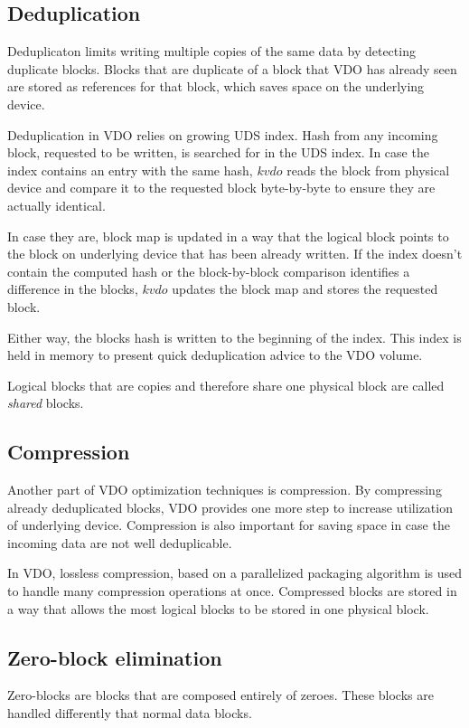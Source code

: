 \documentclass[
  color, %
  table, %
  lof,   %
  lot,   %
]{fithesis3}
\begin{document}
\subsection{Deduplication}
Deduplicaton limits writing multiple copies of the same data by detecting duplicate blocks. Blocks that are duplicate of a block that VDO has already seen are stored as references for that block, which saves space on the underlying device.

Deduplication in VDO relies on growing UDS index. Hash from any incoming block, requested to be written, is searched for in the UDS index. In case the index contains an entry with the same hash, $kvdo$ reads the block from physical device and compare it to the requested block byte-by-byte to ensure they are actually identical.

In case they are, block map is updated in a way that the logical block points to the block on underlying device that has been already written. If the index doesn't contain the computed hash or the block-by-block comparison identifies a difference in the blocks, $kvdo$ updates the block map and stores the requested block.

Either way, the blocks hash is written to the beginning of the index. This index is held in memory to present quick deduplication advice to the VDO volume.

Logical blocks that are copies and therefore share one physical block are called \emph{shared} blocks.

\subsection{Compression}
Another part of VDO optimization techniques is compression. By compressing already deduplicated blocks, VDO provides one more step to increase utilization of underlying device. Compression is also important for saving space in case the incoming data are not well deduplicable.

In VDO, lossless compression, based on a parallelized packaging algorithm is used to handle many compression operations at once. Compressed blocks are stored in a way that allows the most logical blocks to be stored in one physical block.


\subsection{Zero-block elimination}
Zero-blocks are blocks that are composed entirely of zeroes. These blocks are handled differently that normal data blocks.
\end{document}
